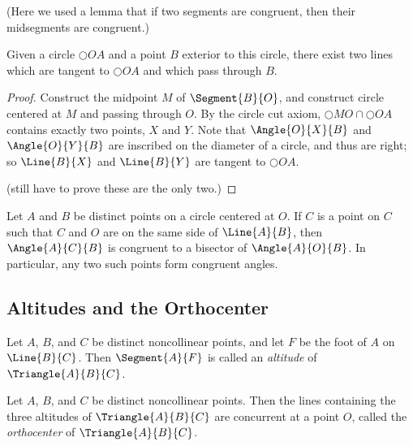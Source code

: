 (Here we used a lemma that if two segments are congruent, then their midsegments are congruent.)

\begin{construct}
Given a circle \(\Circle{O}{A}\) and a point \(B\) exterior to this circle, there exist two lines which are tangent to \(\Circle{O}{A}\) and which pass through \(B\).
\end{construct}

\begin{proof}
Construct the midpoint \(M\) of \(\Segment{B}{O}\), and construct circle centered at \(M\) and passing through \(O\).
By the circle cut axiom, \(\Circle{M}{O} \cap \Circle{O}{A}\) contains exactly two points, \(X\) and \(Y\).
Note that \(\Angle{O}{X}{B}\) and \(\Angle{O}{Y}{B}\) are inscribed on the diameter of a circle, and thus are right; so \(\Line{B}{X}\) and \(\Line{B}{Y}\) are tangent to \(\Circle{O}{A}\).

(still have to prove these are the only two.)
\end{proof}

\begin{prop}
Let \(A\) and \(B\) be distinct points on a circle centered at \(O\).
If \(C\) is a point on \(C\) such that \(C\) and \(O\) are on the same side of \(\Line{A}{B}\), then \(\Angle{A}{C}{B}\) is congruent to a bisector of \(\Angle{A}{O}{B}\).
In particular, any two such points form congruent angles.
\end{prop}

\subsection*{Altitudes and the Orthocenter}

\begin{dfn}
Let \(A\), \(B\), and \(C\) be distinct noncollinear points, and let \(F\) be the foot of \(A\) on \(\Line{B}{C}\).
Then \(\Segment{A}{F}\) is called an \emph{altitude} of \(\Triangle{A}{B}{C}\).
\end{dfn}

\begin{prop}
Let \(A\), \(B\), and \(C\) be distinct noncollinear points.
Then the lines containing the three altitudes of \(\Triangle{A}{B}{C}\) are concurrent at a point \(O\), called the \emph{orthocenter} of \(\Triangle{A}{B}{C}\).
\end{prop}
